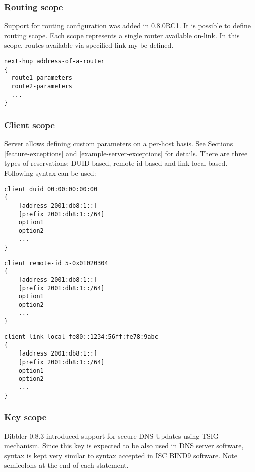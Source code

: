 \subsubsection{Routing scope}
\label{server-route-scope}
Support for routing configuration was added in 0.8.0RC1. It is
possible to define routing scope. Each scope represents a single
router available on-link. In this scope, routes available via
specified link my be defined.

\begin{lstlisting}
next-hop address-of-a-router
{
  route1-parameters
  route2-parameters
  ...
}
\end{lstlisting}

\subsubsection{Client scope}
\label{server-scope-client}
Server allows defining custom parameters on a per-host basis. See
Sections \ref{feature-exceptions} and \ref{example-server-exceptions}
for details. There are three types of reservations: DUID-based,
remote-id based and link-local based. Following syntax can be used:

\begin{lstlisting}
client duid 00:00:00:00:00
{
    [address 2001:db8:1::]
    [prefix 2001:db8:1::/64]
    option1
    option2
    ...
}
\end{lstlisting}

\begin{lstlisting}
client remote-id 5-0x01020304
{
    [address 2001:db8:1::]
    [prefix 2001:db8:1::/64]
    option1
    option2
    ...
}
\end{lstlisting}

\begin{lstlisting}
client link-local fe80::1234:56ff:fe78:9abc
{
    [address 2001:db8:1::]
    [prefix 2001:db8:1::/64]
    option1
    option2
    ...
}
\end{lstlisting}

\subsubsection{Key scope}
Dibbler 0.8.3 introduced support for secure DNS Updates using TSIG
mechanism. Since this key is expected to be also used in DNS server
software, syntax is kept very similar to syntax accepted in
\href{http://www.isc.org/software/bind}{ISC BIND9} software. Note
semicolons at the end of each statement.

